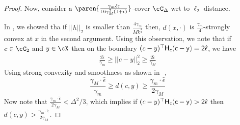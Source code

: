 \begin{proof}
    Now, consider a $\paren{\frac{\gamma_m \hat{\epsilon}\epsilon}{16\gamma_M^2 (1 + \epsilon)}}$-cover $\cC_\Delta$ wrt to $\ell_2$ distance. 
    
    In , we showed tha if $||h||_2$ is smaller than $\frac{4\gamma_m}{Mk^{\frac{3}{2}}}$ then, $d(x,\cdot)$ is $\frac{\gamma_m}{4}$-strongly convex at $x$ in the second argument. Using this observation, we note that if $c \in \cC_2$ and $y \in \cX$ then on the boundary  $(c - y)^{\top}\sf{H}_c(c - y) = 2 \hat{\epsilon}$, we have
    \begin{align*}
        \frac{2\hat{\epsilon}}{\gamma_m}  \ge ||c - y||_2^2 \ge \frac{2\hat{\epsilon}}{\gamma_M}
    \end{align*}
    Using strong convexity and smoothness as shown in -,
    \begin{equation*}
         \frac{\gamma_M\cdot \hat{\epsilon}}{\gamma_m} \ge d(c,y) \ge \frac{\gamma_m\cdot \hat{\epsilon}}{2\gamma_M}
    \end{equation*}
    Now note that $\frac{\gamma_m\cdot \hat{\epsilon}}{2\gamma_M} < \Delta^2/3$, which implies if $(c - y)^{\top}\sf{H}_c(c - y) > 2\hat{\epsilon}$ then $d(c,y) > \frac{\gamma_m\cdot \hat{\epsilon}}{2\gamma_M}$.


\end{proof}
